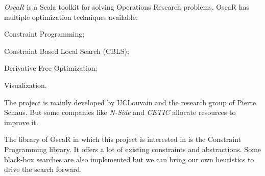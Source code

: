 \documentclass[../../thesis.tex]{subfiles}
\begin{document}
\emph{OscaR} \cite{oscar} is a Scala toolkit for solving Operations Research problems. 
OscaR has multiple optimization techniques available:
\begin{enumerate*}[label=(\roman*)]
  \item Constraint Programming;
  \item Constraint Based Local Search (CBLS);
  \item Derivative Free Optimization;
  \item Visualization.
\end{enumerate*}


The project is mainly developed by UCLouvain and the research group of Pierre Schaus. But some companies like \emph{N-Side} and \emph{CETIC} allocate resources to improve it.

The library of OscaR in which this project is interested in is the Constraint Programming library. It offers a lot of existing constraints and abstractions. Some black-box searches are also 
implemented but we can bring our own heuristics to drive the search forward.
\end{document}
